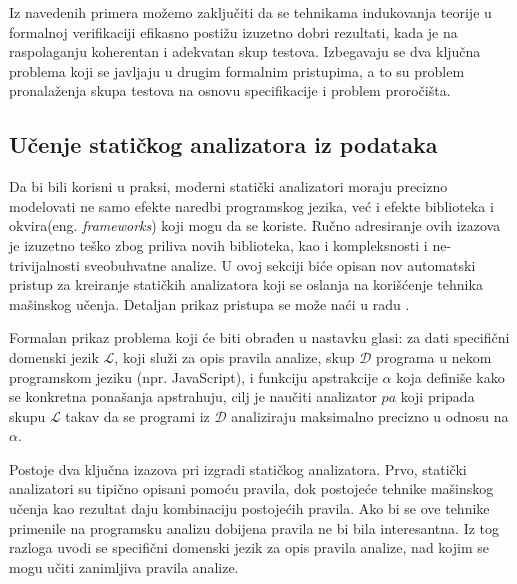 \documentclass[a4paper]{article}
\theoremstyle{definition}
\begin{document}
{\par Iz navedenih primera možemo zaključiti da se tehnikama indukovanja teorije u formalnoj verifikaciji efikasno postižu izuzetno dobri rezultati, kada je na raspolaganju koherentan i adekvatan skup testova. Izbegavaju se dva ključna problema koji se javljaju u drugim formalnim pristupima, a to su problem pronalaženja skupa testova na osnovu specifikacije i problem proročišta.

\subsection{Učenje statičkog analizatora iz podataka}
\label{subsec:staticki-analizator}

Da bi bili korisni u praksi, moderni statički analizatori moraju precizno 
modelovati ne samo efekte naredbi programskog jezika, već i efekte biblioteka 
i okvira(eng. \emph{frameworks}) koji mogu da se koriste. Ručno adresiranje ovih izazova 
je izuzetno teško zbog priliva novih biblioteka, kao i kompleksnosti i 
ne-trivijalnosti sveobuhvatne analize. U ovoj sekciji biće opisan nov 
automatski pristup za kreiranje statičkih analizatora koji se oslanja na 
korišćenje tehnika mašinskog učenja. Detaljan prikaz pristupa se može naći 
u radu \cite{staticAnalyzer}.

Formalan prikaz problema koji će biti obrađen u nastavku glasi: za dati 
specifični domenski jezik $\mathcal{L}$, koji služi za opis pravila analize, 
skup $\mathcal{D}$ programa u nekom programskom jeziku (npr. JavaScript), i 
funkciju apstrakcije $\alpha$ koja definiše kako se konkretna ponašanja 
apstrahuju, cilj je naučiti analizator $pa$ koji pripada skupu $\mathcal{L}$ 
takav da se programi iz $\mathcal{D}$ analiziraju maksimalno precizno u odnosu 
na $\alpha$.


Postoje dva ključna izazova pri izgradi statičkog analizatora. Prvo, statički 
analizatori su tipično opisani pomoću pravila, dok postojeće tehnike mašinskog 
učenja kao rezultat daju kombinaciju postojećih pravila. Ako bi se ove tehnike 
primenile na programsku analizu \cite{predictingProgramProperties} dobijena 
pravila ne bi bila interesantna. Iz tog razloga uvodi se specifični domenski 
jezik za opis pravila analize, nad kojim se mogu učiti zanimljiva pravila analize.


}
\end{document}
